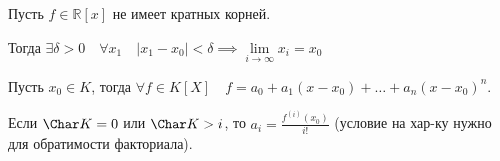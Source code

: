 \begin{theorem} \thmslashn

    Пусть $f\in \mathbb{R}[x]$ не имеет кратных корней.

    Тогда $\exists{\delta > 0}\quad \forall{x_1}\quad |x_1-x_0| < \delta \implies \lim\limits_{i \to \infty} x_i = x_0$
\end{theorem}
\begin{statement} \thmslashn

    Пусть $x_0\in K$, тогда $\forall{f\in K[X]}\quad f = a_0+a_1(x-x_0) + \ldots + a_{n}(x-x_0)^{n}$.

    Если $\Char K = 0$ или $\Char K > i$, то $a_{i} = \frac{f^{(i)}(x_0)}{i!}$ (условие на хар-ку нужно для обратимости факториала).
\end{statement}
